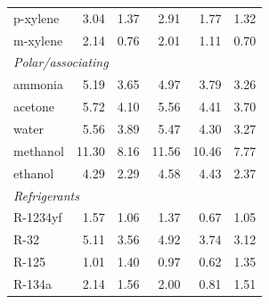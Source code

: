 \begin{table}[H]
\begin{tabular}{lrrrrr}
\quad p-xylene & 3.04 & 1.37 & 2.91 & 1.77 & 1.32 \\
\quad m-xylene & 2.14 & 0.76 & 2.01 & 1.11 & 0.70 \\
\multicolumn{6}{l}{\itshape Polar/associating}\\
\quad ammonia & 5.19 & 3.65 & 4.97 & 3.79 & 3.26 \\
\quad acetone & 5.72 & 4.10 & 5.56 & 4.41 & 3.70 \\
\quad water & 5.56 & 3.89 & 5.47 & 4.30 & 3.27 \\
\quad methanol & 11.30 & 8.16 & 11.56 & 10.46 & 7.77 \\
\quad ethanol & 4.29 & 2.29 & 4.58 & 4.43 & 2.37 \\
\multicolumn{6}{l}{\itshape Refrigerants}\\
\quad R-1234yf & 1.57 & 1.06 & 1.37 & 0.67 & 1.05 \\
\quad R-32 & 5.11 & 3.56 & 4.92 & 3.74 & 3.12 \\
\quad R-125 & 1.01 & 1.40 & 0.97 & 0.62 & 1.35 \\
\quad R-134a & 2.14 & 1.56 & 2.00 & 0.81 & 1.51 \\
\bottomrule
\end{tabular}
\end{table}
